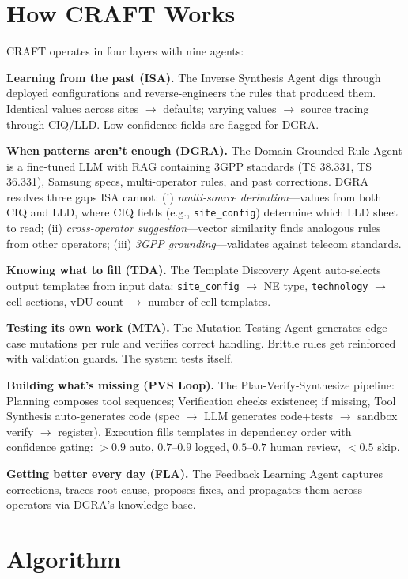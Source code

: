 \documentclass[10pt]{article}
\begin{document}
	\section{How CRAFT Works}
	
	CRAFT operates in four layers with nine agents:
	
	\textbf{Learning from the past (ISA).} The Inverse Synthesis Agent digs through deployed configurations and reverse-engineers the rules that produced them. Identical values across sites $\to$ defaults; varying values $\to$ source tracing through CIQ/LLD. Low-confidence fields are flagged for DGRA.
	
	\textbf{When patterns aren't enough (DGRA).} The Domain-Grounded Rule Agent is a fine-tuned LLM with RAG containing 3GPP standards (TS 38.331, TS 36.331), Samsung specs, multi-operator rules, and past corrections. DGRA resolves three gaps ISA cannot: (i) \emph{multi-source derivation}---values from both CIQ and LLD, where CIQ fields (e.g., \texttt{site\_config}) determine which LLD sheet to read; (ii) \emph{cross-operator suggestion}---vector similarity finds analogous rules from other operators; (iii) \emph{3GPP grounding}---validates against telecom standards.
	
	\textbf{Knowing what to fill (TDA).} The Template Discovery Agent auto-selects output templates from input data: \texttt{site\_config} $\to$ NE type, \texttt{technology} $\to$ cell sections, vDU count $\to$ number of cell templates.
	
	\textbf{Testing its own work (MTA).} The Mutation Testing Agent generates edge-case mutations per rule and verifies correct handling. Brittle rules get reinforced with validation guards. The system tests itself.
	
	\textbf{Building what's missing (PVS Loop).} The Plan-Verify-Synthesize pipeline: Planning composes tool sequences; Verification checks existence; if missing, Tool Synthesis auto-generates code (spec $\to$ LLM generates code+tests $\to$ sandbox verify $\to$ register). Execution fills templates in dependency order with confidence gating: $>0.9$ auto, $0.7$--$0.9$ logged, $0.5$--$0.7$ human review, $<0.5$ skip.
	
	\textbf{Getting better every day (FLA).} The Feedback Learning Agent captures corrections, traces root cause, proposes fixes, and propagates them across operators via DGRA's knowledge base.
	
	\section{Algorithm}
	
\end{document}
